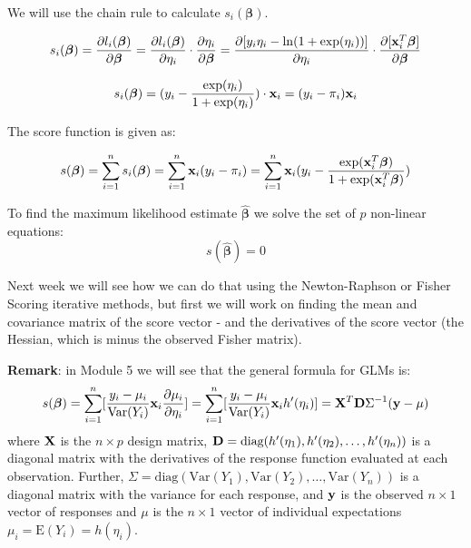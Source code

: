 \documentclass[
  ignorenonframetext,
]{beamer}
\begin{document}
\begin{frame}
We will use the chain rule to calculate \(s_i(\boldsymbol{\beta})\).

\[s_i(\boldsymbol{\beta})=\frac{\partial l_i(\boldsymbol{\beta})}{\partial \boldsymbol{\beta}}=\frac{\partial l_i(\boldsymbol{\beta})}{\partial \eta_i}\cdot \frac{\partial \eta_i}{\partial \boldsymbol{\beta}}=\frac{\partial [y_i\eta_i-\ln(1+{\exp(\eta_i)})]}{\partial \eta_i}\cdot \frac{\partial [{\bf x}_i^T\boldsymbol{\beta} ]}{\partial \boldsymbol{\beta}}\]

\[s_i(\boldsymbol{\beta})=(y_i-\frac{\exp(\eta_i)}{1+\exp(\eta_i)})\cdot {\bf x}_i=(y_i-\pi_i) {\bf x}_i \]
\end{frame}

\begin{frame}
The score function is given as:

\[s(\boldsymbol{\beta})=\sum_{i=1}^n s_i(\boldsymbol{\beta})=\sum_{i=1}^n {\bf x}_i (y_i-\pi_i)=\sum_{i=1}^n {\bf x}_i (y_i-\frac{\exp({\bf x}_i^T\boldsymbol{\beta})}{1+\exp({\bf x}_i^T\boldsymbol{\beta})})\]

To find the maximum likelihood estimate \(\hat{\boldsymbol{\beta}}\) we
solve the set of \(p\) non-linear equations:
\[s(\hat{\boldsymbol{\beta}})=0\]

Next week we will see how we can do that using the Newton-Raphson or
Fisher Scoring iterative methods, but first we will work on finding the
mean and covariance matrix of the score vector - and the derivatives of
the score vector (the Hessian, which is minus the observed Fisher
matrix).
\end{frame}

\begin{frame}
\textbf{Remark}: in Module 5 we will see that the general formula for
GLMs is: \[s(\boldsymbol{\beta})=\sum_{i=1}^n
[\frac{y_i-\mu_i}{\text{Var}(Y_i)}{\bf x}_i \frac{\partial \mu_i}{\partial \eta_i}]=\sum_{i=1}^n
[\frac{y_i-\mu_i}{\text{Var}(Y_i)}{\bf x}_i h'(\eta_i)]={\bf X}^T {\bf D} \Sigma^{-1} ({\bf y} -\mu)\]
where \({\bf X}\) is the \(n\times p\) design matrix,
\({\bf D}=\text{diag}(h'(\eta_1),h'(\eta_2),\ldots,h'(\eta_n))\) is a
diagonal matrix with the derivatives of the response function evaluated
at each observation. Further,
\(\Sigma=\text{diag}(\text{Var}(Y_1),\text{Var}(Y_2),\ldots,\text{Var}(Y_n))\)
is a diagonal matrix with the variance for each response, and
\({\bf y}\) is the observed \(n\times 1\) vector of responses and
\(\mu\) is the \(n\times 1\) vector of individual expectations
\(\mu_i=\text{E}(Y_i)=h(\eta_i)\).
\end{frame}

\begin{frame}
\end{frame}
\end{document}
